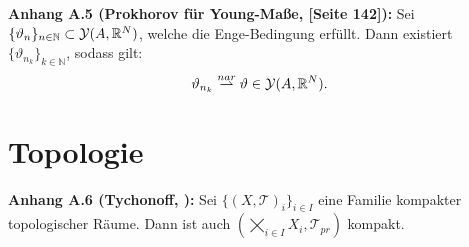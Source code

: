 \documentclass[
	language=german, %
	type=master, %
]{isthesis}
\begin{document}
\begin{appendix}
\colorbox{generalYellow}{\begin{minipage}{16cm}{\textcolor{black}{}{\label{korA.5}}}
\textbf{Anhang A.5 (Prokhorov für Young-Maße, \cite{AttouchCalcVar}[Seite 142]):} Sei \(\{\vartheta_n\}_{n \in \mathbb{N}} \subset \mathcal{Y}(A,\mathbb{R}^N)\), welche die Enge-Bedingung erfüllt. Dann existiert \(\{\vartheta_{n_k}\}_{k \in \mathbb{N}}\), sodass gilt:
\begin{equation}
    \vartheta_{n_k} \stackrel{nar}{\rightharpoonup} \vartheta \in \mathcal{Y}(A,\mathbb{R}^N).
\end{equation}
\end{minipage}}
        \section{Topologie}
\colorbox{generalYellow}{\begin{minipage}{16cm}{\textcolor{black}{}{\label{theoA.6}}}
\textbf{Anhang A.6 (Tychonoff, \cite{wright1994tychonoff}):} Sei \(\{(X,\mathcal{T})_i\}_{i \in I}\) eine Familie kompakter topologischer Räume. Dann ist auch \((\bigtimes_{i \in I} X_i, \mathcal{T}_{pr})\) kompakt.
\end{minipage}}\\


\end{appendix}
\end{document}

